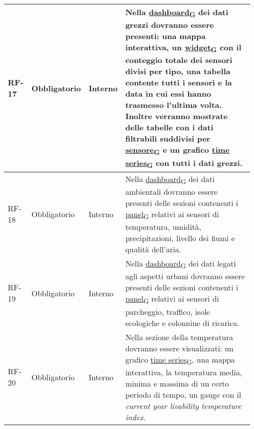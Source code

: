 \begin{longtable}{|>{\centering\arraybackslash}m{}|>{\centering\arraybackslash}m{}|>{\centering\arraybackslash}m{}|>{\centering\arraybackslash}m{}|}
	RF-17           & Obbligatorio        & Interno                                                                                                           & Nella \href{https://7last.github.io/docs/pb/documentazione-interna/glossario\#dashboard}{dashboard\textsubscript{G}} dei dati grezzi dovranno essere presenti: una mappa interattiva, un \href{https://7last.github.io/docs/pb/documentazione-interna/glossario\#widget}{widget\textsubscript{G}} con il conteggio totale dei sensori divisi per tipo, una tabella contente tutti i sensori e la data in cui essi hanno trasmesso l'ultima volta. Inoltre verranno mostrate delle tabelle con i dati filtrabili suddivisi per \href{https://7last.github.io/docs/pb/documentazione-interna/glossario\#sensore}{sensore\textsubscript{G}} e un grafico \href{https://7last.github.io/docs/pb/documentazione-interna/glossario\#time-series}{time series\textsubscript{G}} con tutti i dati grezzi.
	\\\hline
	RF-18           & Obbligatorio        & Interno                                                                                                           & Nella \href{https://7last.github.io/docs/pb/documentazione-interna/glossario\#dashboard}{dashboard\textsubscript{G}} dei dati ambientali dovranno essere presenti delle sezioni contenenti i \href{https://7last.github.io/docs/pb/documentazione-interna/glossario\#panel}{panel\textsubscript{G}} relativi ai sensori di temperatura, umidità, precipitazioni, livello dei fiumi e qualità dell'aria.
	\\\hline
	RF-19           & Obbligatorio        & Interno                                                                                                           & Nella \href{https://7last.github.io/docs/pb/documentazione-interna/glossario\#dashboard}{dashboard\textsubscript{G}} dei dati legati agli aspetti urbani dovranno essere presenti delle sezioni contenenti i \href{https://7last.github.io/docs/pb/documentazione-interna/glossario\#panel}{panel\textsubscript{G}} relativi ai sensori di parcheggio, traffico, isole ecologiche e colonnine di ricarica.
	\\\hline
	RF-20           & Obbligatorio        & Interno                                                                                                           & Nella sezione della temperatura dovranno essere visualizzati: un grafico \href{https://7last.github.io/docs/pb/documentazione-interna/glossario\#time-series}{time series\textsubscript{G}}, una mappa interattiva, la temperatura media, minima e massima di un certo periodo di tempo, un gauge con il \textit{current year livability temperature index}.

\end{longtable}
